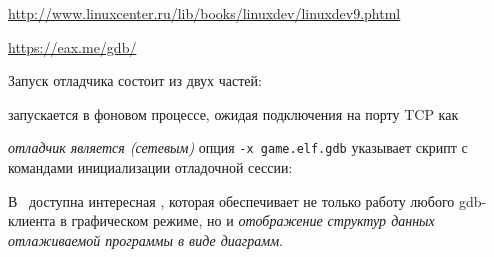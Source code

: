\url{http://www.linuxcenter.ru/lib/books/linuxdev/linuxdev9.phtml}

\url{https://eax.me/gdb/}

\medskip\noindent
Запуск отладчика состоит из двух частей:
\begin{description}[nosep]
\item[qemu] запускается в фоновом процессе, ожидая подключения на порту TCP
 как 
\item[gdb] \emph{отладчик является (сетевым) }
опция \verb|-x game.elf.gdb| указывает скрипт с командами инициализации
отладочной сессии:
\end{description}

\clearpage
{}

В \linux\ доступна интересная  , которая
обеспечивает не только работу любого gdb-клиента в графическом режиме, но и
\emph{отображение структур данных отлаживаемой программы в виде диаграмм}.


\clearpage
{}
\clearpage
{}
\clearpage
{}


\secup

